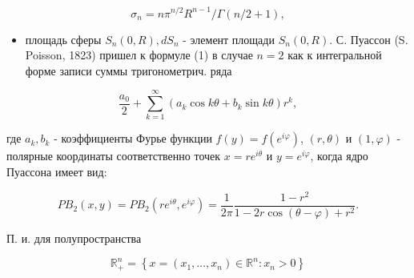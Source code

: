 \documentclass[10pt]{article}
\begin{document}
\[

\sigma_{n}=n \pi^{n / 2} R^{n-1} / \Gamma(n / 2+1),

\]



\begin{itemize}

  \item площадь сферы $S_{n}(0, R), d S_{n}$ - элемент площади $S_{n}(0, R)$. С. Пуассон (S. Poisson, 1823) пришел к формуле (1) в случае $n=2$ как к интегральной форме записи суммы тригонометрич. ряда

\end{itemize}



\[

\frac{a_{0}}{2}+\sum_{k=1}^{\infty}\left(a_{k} \cos k \theta+b_{k} \sin k \theta\right) r^{k},

\]



где $a_{k}, b_{k}$ - коэффициенты Фурье функции $f(y)=f\left(e^{i \varphi}\right)$, $(r, \theta)$ и $(1, \varphi)$ - полярные координаты соответственно точек $x=r e^{i \theta}$ и $y=e^{i \varphi}$, когда ядро Пуассона имеет вид:



\[

P B_{2}(x, y)=P B_{2}\left(r e^{i \theta}, e^{i \varphi}\right)=\frac{1}{2 \pi} \frac{1-r^{2}}{1-2 r \cos (\theta-\varphi)+r^{2}} .

\]



П. и. для полупространства



\[

\mathbb{R}_{+}^{n}=\left\{x=\left(x_{1}, \ldots, x_{n}\right) \in \mathbb{R}^{n}: x_{n}>0\right\}

\]
\end{document}
